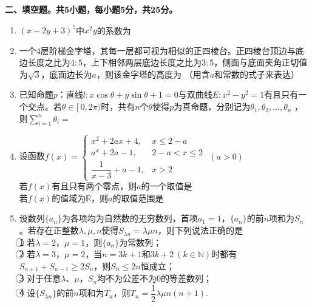 \documentclass[11pt,a4paper]{ctexart}
\newcommand{\sectiontitle}[1]{
  \par\noindent\textbf{#1}\par%
  }
\begin{document}
\newpage
\sectiontitle{二、填空题。共5小题，每小题5分，共25分。}
\begin{enumerate}[start=11] %

    \item$(x-2y+3)^5$中$x^2 y$的系数为\underline{\hspace{2cm}}

    \item 一个$4$层阶梯金字塔，其每一层都可视为相似的正四棱台。正四棱台顶边与底边长度之比为$4:5$，上下相邻两层底边长度之比为$3:5$，侧面与底面夹角正切值为$\sqrt3$，底面边长为$a$，则该金字塔的高度为
    \underline{\hspace{2cm}}
    （用含$a$和常数的式子来表达）

    \item 已知命题$p$：直线$l:x \cos \theta + y \sin \theta + 1=0$与双曲线$E:x^2-y^2=1$有且只有一个交点。若$ \theta \in [\ 0,2 \pi )$时，共有$n$个$\theta$使得$p$为真命题，分别记为$\theta_1,\theta_2, \ldots ,\theta_n$ ，则$\sum_{i=1}^{n} \theta_i=$
    \underline{\hspace{2cm}}

    \item 设函数$f(x) =
        \begin{cases}
        x^2+2ax+4, & x  \le 2-a \\
        a^x+2a-1, & 2-a<x \le 2\\
        \dfrac{1}{x-3}+a-1, &x>2
        \end{cases}$
        \hspace{1cm} $ (a>0)$\\[1em]
        若$f(x)$有且只有两个零点，则$a$的一个取值是\underline{\hspace{2cm}}\\
        若$f(x)$的值域为$\mathbb{R}$，则$a$的取值范围是 
        \underline{\hspace{2cm}}

    \item 设数列$\{a_n\}$为各项均为自然数的无穷数列，首项$a_1=1$，$\{a_n\}$的前$n$项和为$S_n$。若存在正整数$\lambda,\mu,n$使得$S_{\lambda n}=\lambda \mu n$，则下列说法正确的是
    \underline{\hspace{2cm}}\\
    \textcircled{1}  若$\lambda=2$，$\mu=1$，则$\{a_n\}$为常数列；\\
    \textcircled {2} 若$\lambda=3$，$\mu=2$，当$n=3k+1$和$3k+2\ (k\in \mathbb{N})$时都有$S_{n+1}+ S_{n-1}\ge 2S_n$，则$S_n \le 2n$恒成立；\\
    \textcircled {3} 对于任意$\lambda$、$\mu$，$S_n$均不为公差不为0的等差数列；\\
    \textcircled {4} 设$\{ S_{\lambda n} \}$的前$n$项和为$T_n$，则$T_n=\dfrac{1}{2} \lambda \mu n(n+1)$.
    
\end{enumerate}
\end{document}
